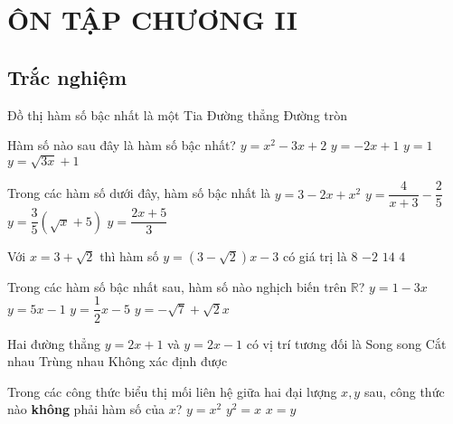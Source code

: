 \section{ÔN TẬP CHƯƠNG II}
\subsection{Trắc nghiệm}
\begin{bt}%
	Đồ thị hàm số bậc nhất là một
	{Tia}
	{\True Đường thẳng}
	{Đường tròn}
\end{bt}
\begin{bt}%
	Hàm số nào sau đây là hàm số bậc nhất?
	\choice
	{$y=x^2-3x+2$}
	{\True $y=-2x+1$}
	{$y=1$}
	{$y=\sqrt{3x}+1$}
\end{bt}


\begin{bt}%
	Trong các hàm số dưới đây, hàm số bậc nhất là
	\choice
	{$y=3-2x+x^2$}
	{$y=\dfrac{4}{x+3}-\dfrac{2}{5}$}
	{$y=\dfrac{3}{5}(\sqrt{x}+5)$}
	{\True $y=\dfrac{2x+5}{3}$}
\end{bt}


\begin{bt}%
	Với $x=3+\sqrt{2}$ thì hàm số $y=(3-\sqrt{2})x-3$ có giá trị là
	\choice
	{$8$}
	{$-2$}
	{$14$}
	{\True $4$}
\end{bt}


\begin{bt}%
	Trong các hàm số bậc nhất sau, hàm số nào nghịch biến trên $\mathbb{R}$?
	\choice
	{\True $y=1-3x$}
	{$y=5x-1$}
	{$y=\dfrac{1}{2}x-5$}
	{$y=-\sqrt{7}+\sqrt{2}x$}
\end{bt}


\begin{bt}%
	Hai đường thẳng $y=2x+1$ và $y=2x-1$ có vị trí tương đối là
	\choice
	{\True Song song}
	{Cắt nhau}
	{Trùng nhau}
	{Không xác định được}
\end{bt}
\begin{bt}%
	Trong các công thức biểu thị mối liên hệ giữa hai đại lượng $x,y$ sau, công thức nào \textbf{không} phải hàm số của $x$?
	{$y=x^2$}
	{\True $y^2=x$}
	{$x=y$}
\end{bt}

